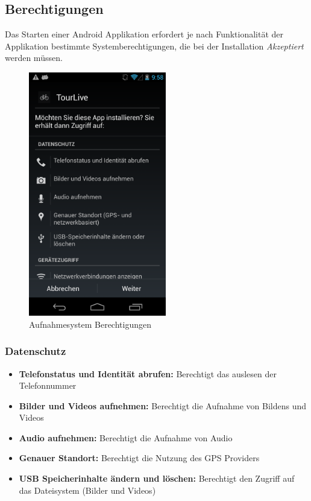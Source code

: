 \subsection{Berechtigungen}
Das Starten einer Android Applikation erfordert je nach Funktionalität der Applikation bestimmte Systemberechtigungen, die bei der Installation \textit{Akzeptiert} werden müssen.
\begin{figure}[H]
	\centering
	\includegraphics[width=60mm]{images/android/berechtigungen.png}
	\caption{Aufnahmesystem Berechtigungen}
\end{figure}
\subsubsection{Datenschutz}

\begin{itemize} [noitemsep,topsep=0pt]
	\item \textbf{Telefonstatus und Identität abrufen:} Berechtigt das auslesen der Telefonnummer
	\item \textbf{Bilder und Videos aufnehmen:} Berechtigt die Aufnahme von Bildens und Videos
	\item \textbf{Audio aufnehmen:} Berechtigt die Aufnahme von Audio
	\item \textbf{Genauer Standort:} Berechtigt die Nutzung des GPS Providers
	\item \textbf{USB Speicherinhalte ändern und löschen:} Berechtigt den Zugriff auf das Dateisystem (Bilder und Videos)
\end{itemize}

